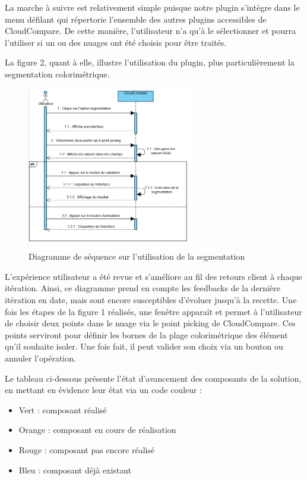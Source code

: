 \documentclass[12pt,titlepage,french]{article}
\begin{document}
La marche à suivre est relativement simple puisque notre plugin s'intègre dans le menu défilant qui répertorie l'ensemble des autres plugins accessibles de CloudCompare. De cette manière, l'utilisateur n'a qu'à le sélectionner et pourra l'utiliser si un ou des nuages ont été choisis pour être traités. \newline

La figure 2, quant à elle, illustre l'utilisation du plugin, plus particulièrement la segmentation colorimétrique.

\begin{figure}[H]
\center
  \includegraphics[width=0.65\textwidth]{./img/sequDiagrSegmentation.PNG}
  \caption{\label{} Diagramme de séquence sur l'utilisation de la segmentation}
\end{figure}

L'expérience utilisateur a été revue et s'améliore au fil des retours client à chaque itération. Ainsi, ce diagramme prend en compte les feedbacks de la dernière itération en date, mais sont encore susceptibles d'évoluer jusqu'à la recette. Une fois les étapes de la figure 1 réalisés, une fenêtre apparaît et permet à l'utilisateur de choisir deux points dans le nuage via le point picking de CloudCompare. Ces points serviront pour définir les bornes de la plage colorimétrique des élément qu'il souhaite isoler. Une fois fait, il peut valider son choix via un bouton ou annuler l'opération. \newline

Le tableau ci-dessous présente l'état d'avancement des composants de la solution, en mettant en évidence leur état via un code couleur :
\begin{itemize}
    \item Vert : composant réalisé
    \item Orange : composant en cours de réalisation
    \item Rouge : composant pas encore réalisé
    \item Bleu : composant déjà existant
\end{itemize}
\end{document}
